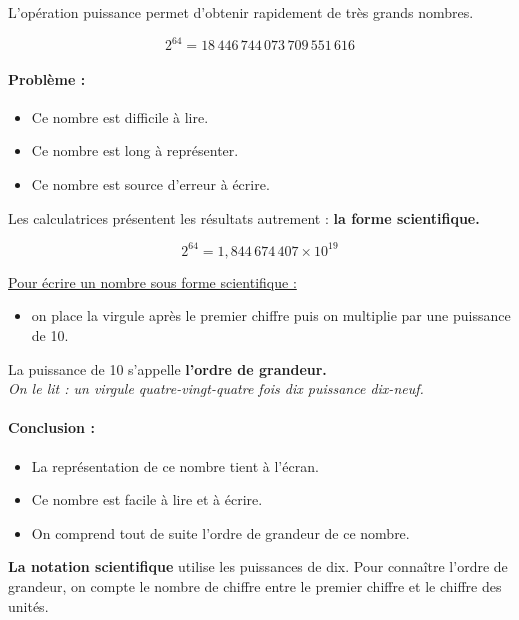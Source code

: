 \begin{multicols}{2}

  L'opération puissance permet d'obtenir rapidement de très grands nombres.

  $$2^{64} = 18 \, 446 \, 744 \, 073 \, 709 \, 551 \, 616$$

  \paragraph{Problème :}

  \begin{itemize}
  \item Ce nombre est difficile à lire.
  \item Ce nombre est long à représenter.
  \item Ce nombre est source d'erreur à écrire.
  \end{itemize}

  Les calculatrices présentent les résultats autrement : \textbf{la forme scientifique.}

  $$2^{64} = 1,844 \, 674 \, 407 \times 10^{19}$$

  \columnbreak

  \underline{Pour écrire un nombre sous forme scientifique :} \\
  \begin{itemize}
  \item on place la virgule après le premier chiffre puis on multiplie par une puissance de 10. \\
  \end{itemize}

  La puissance de 10 s'appelle \textbf{l'ordre de grandeur.}\\
  \textit{On le lit : un virgule quatre-vingt-quatre fois dix puissance dix-neuf.}

  \paragraph{Conclusion :}

  \begin{itemize}
  \item La représentation de ce nombre tient à l'écran.
  \item Ce nombre est facile à lire et à écrire.
  \item On comprend tout de suite l'ordre de grandeur de ce nombre.
  \end{itemize}

    \textbf{La notation scientifique} utilise les puissances de dix. Pour connaître l'ordre de grandeur, on compte le nombre de chiffre entre le premier chiffre et le chiffre des unités. \\ 
\end{multicols}

